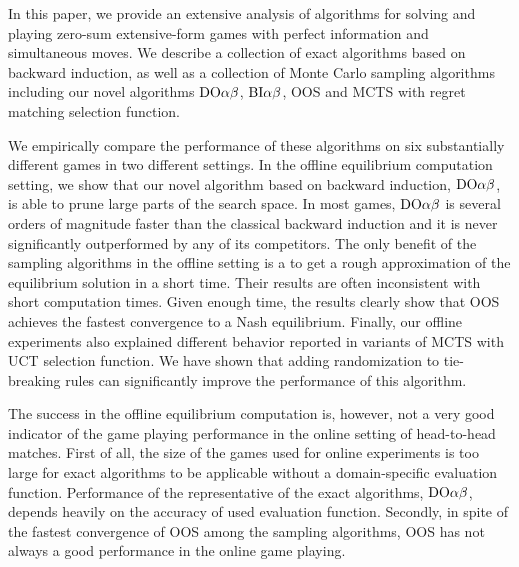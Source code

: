 
In this paper, we provide an extensive analysis of algorithms for solving and playing zero-sum extensive-form games with perfect information and simultaneous moves. We describe a collection of exact algorithms based on backward induction, as well as a collection of Monte Carlo sampling algorithms including our novel algorithms $\textrm{DO}\alpha\beta$, $\textrm{BI}\alpha\beta$, OOS and MCTS with regret matching selection function. 

We empirically compare the performance of these algorithms on six substantially different games in two different settings. In the offline equilibrium computation setting, we show that our novel algorithm based on backward induction, $\textrm{DO}\alpha\beta$, is able to prune large parts of the search space. In most games, $\textrm{DO}\alpha\beta$ is several orders of magnitude faster than the classical backward induction and it is never significantly outperformed by any of its competitors. The only benefit of the sampling algorithms in the offline setting is a to get a rough approximation of the equilibrium solution in a short time. Their results are often inconsistent with short computation times. Given enough time, the results clearly show that OOS achieves the fastest convergence to a Nash equilibrium. Finally, our offline experiments also explained different behavior reported in variants of MCTS with UCT selection function. We have shown that adding randomization to tie-breaking rules can significantly improve the performance of this algorithm.

The success in the offline equilibrium computation is, however, not a very good indicator of the game playing performance in the online setting of head-to-head matches. First of all, the size of the games used for online experiments is too large for exact algorithms to be applicable without a domain-specific evaluation function. Performance of the representative of the exact algorithms, $\textrm{DO}\alpha\beta$, depends heavily on the accuracy of used evaluation function. Secondly, in spite of the fastest convergence of OOS among the sampling algorithms, OOS has not always a good performance in the online game playing. 


